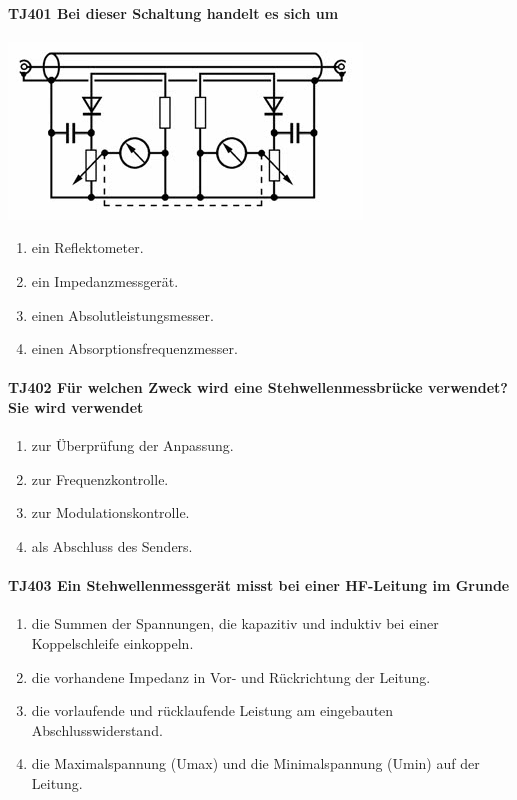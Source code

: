 \documentclass[8pt]{article}
\begin{document}
\paragraph*{TJ401 Bei dieser Schaltung handelt es sich um}
\begin{center}
	\begin{minipage}{\linewidth}
		\centering
		\includegraphics[scale=1.0]{pics/tj401_a.jpg}
	\end{minipage}
\end{center}
\begin{enumerate}[nolistsep,label=\Alph*]
\item ein Reflektometer.
\item ein Impedanzmessgerät.
\item einen Absolutleistungsmesser.
\item einen Absorptionsfrequenzmesser.
\end{enumerate}

\paragraph*{TJ402 Für welchen Zweck wird eine Stehwellenmessbrücke verwendet? Sie wird verwendet}
\begin{enumerate}[nolistsep,label=\Alph*]
\item zur Überprüfung der Anpassung.
\item zur Frequenzkontrolle.
\item zur Modulationskontrolle.
\item als Abschluss des Senders.
\end{enumerate}

\paragraph*{TJ403 Ein Stehwellenmessgerät misst bei einer HF-Leitung im Grunde}
\begin{enumerate}[nolistsep,label=\Alph*]
\item die Summen der Spannungen, die kapazitiv und induktiv bei einer Koppelschleife einkoppeln.
\item die vorhandene Impedanz in Vor- und Rückrichtung der Leitung.
\item die vorlaufende und rücklaufende Leistung am eingebauten Abschlusswiderstand.
\item die Maximalspannung (Umax) und die Minimalspannung (Umin) auf der Leitung.
\end{enumerate}
\end{document}
